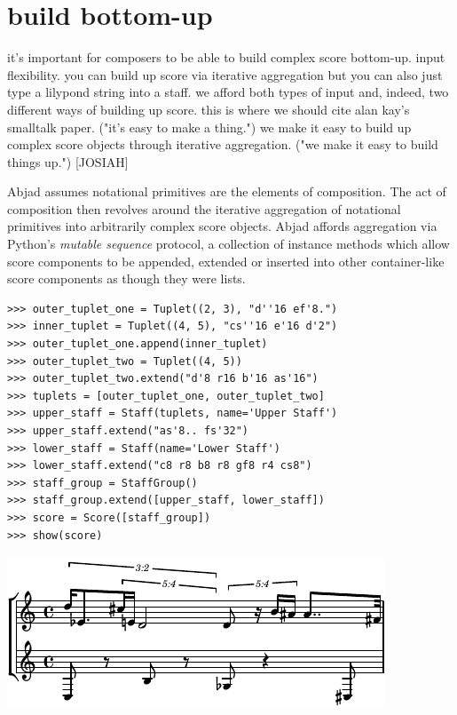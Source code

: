 \documentclass{article}
\begin{document}
\section{build bottom-up}

it's important for composers to be able to build complex
score bottom-up. input flexibility. you can build up score via iterative
aggregation but you can also just type a lilypond string into a staff. we
afford both types of input and, indeed, two different ways of building up
score. this is where we should cite alan kay's smalltalk paper. ("it's easy to
make a thing.") we make it easy to build up complex score objects through
iterative aggregation. ("we make it easy to build things up.") [JOSIAH]

\hrulefill\vspace{5pt}

Abjad assumes notational primitives are the elements of composition. The act of
composition then revolves around the iterative aggregation of notational
primitives into arbitrarily complex score objects. Abjad affords aggregation
via Python's \emph{mutable sequence} protocol, a collection of instance methods
which allow score components to be appended, extended or inserted into other
container-like score components as though they were lists.

\begin{lstlisting}
>>> outer_tuplet_one = Tuplet((2, 3), "d''16 ef'8.")
>>> inner_tuplet = Tuplet((4, 5), "cs''16 e'16 d'2")
>>> outer_tuplet_one.append(inner_tuplet)
>>> outer_tuplet_two = Tuplet((4, 5))
>>> outer_tuplet_two.extend("d'8 r16 b'16 as'16")
>>> tuplets = [outer_tuplet_one, outer_tuplet_two]
>>> upper_staff = Staff(tuplets, name='Upper Staff')
>>> upper_staff.extend("as'8.. fs'32")
>>> lower_staff = Staff(name='Lower Staff')
>>> lower_staff.extend("c8 r8 b8 r8 gf8 r4 cs8")
>>> staff_group = StaffGroup()
>>> staff_group.extend([upper_staff, lower_staff])
>>> score = Score([staff_group])
>>> show(score)
\end{lstlisting}

\includegraphics[scale=1.0]{images/abjad-1.pdf}
\end{document}
